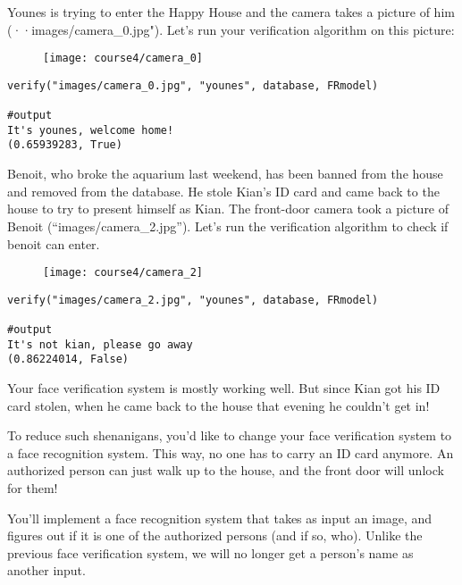 Younes is trying to enter the Happy House and the camera takes a picture of him (··images/camera\_0.jpg"). Let's run your verification algorithm on this picture:
\begin{figure}[h]
\begin{center}
\texttt{[image: course4/camera\_0]}
\end{center}
\end{figure}

\begin{verbatim}
verify("images/camera_0.jpg", "younes", database, FRmodel)

#output
It's younes, welcome home!
(0.65939283, True)
\end{verbatim}


Benoit, who broke the aquarium last weekend, has been banned from the house and removed from the database. He stole Kian's ID card and came back to the house to try to present himself as Kian. The front-door camera took a picture of Benoit (``images/camera\_2.jpg''). Let's run the verification algorithm to check if benoit can enter.
\begin{figure}[h]
\begin{center}
\texttt{[image: course4/camera\_2]}
\end{center}
\end{figure}
\begin{verbatim}
verify("images/camera_2.jpg", "younes", database, FRmodel)

#output
It's not kian, please go away	
(0.86224014, False)
\end{verbatim}








Your face verification system is mostly working well. But since Kian got his ID card stolen, when he came back to the house that evening he couldn't get in! 

To reduce such shenanigans, you'd like to change your face verification system to a face recognition system. This way, no one has to carry an ID card anymore. An authorized person can just walk up to the house, and the front door will unlock for them! 

You'll implement a face recognition system that takes as input an image, and figures out if it is one of the authorized persons (and if so, who). Unlike the previous face verification system, we will no longer get a person's name as another input. 

